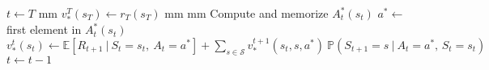 \documentclass{standalone}
\begin{document}
	\begin{varwidth}{1.5\linewidth}
		\par\noindent
		\begin{algorithmic}[1]
			\State $t\gets T$
			 mm
				\State $\displaystyle v^{T}_*(s_{T}) \gets r_T(s_T)$
			\EndFor
			 mm
			 mm
			\State Compute and memorize $A^*_t(s_t)$
			\State $a^* \gets$ first element in $A^*_t(s_t)$
			\State $\displaystyle v^t_*(s_t) \gets \mathbb{E}\left[R_{t+1}\:|\:S_t=s_t,\: A_t=a^* \right] + \sum_{s\in\mathcal{S}} v^{t+1}_*(s_t, s, a^*) \: \mathbb{P}(S_{t+1} = s\:|\: A_{t}=a^*, \, S_t = s_t)$
			\EndFor
			\State $t\gets t - 1$
			\EndWhile
			\EndProcedure
		\end{algorithmic}
	\end{varwidth}
\end{document}
